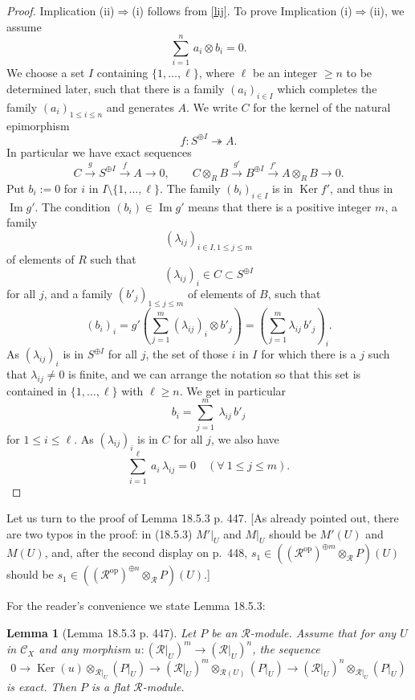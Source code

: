 \documentclass[12pt]{article}%
\newtheorem{lem}[thm]{Lemma}
\theoremstyle{remark}
\theoremstyle{definition}
\newcommand{\cc}{\mathcal}
\newcommand{\C}{\mathcal C}
\newcommand{\epi}{\twoheadrightarrow}
\newcommand{\then}{\Rightarrow}
\newcommand{\xr}{\xrightarrow}
\DeclareMathOperator{\Ima}{Im}
\DeclareMathOperator{\Ker}{Ker}
\DeclareMathOperator{\op}{op}
\begin{document}
\begin{proof} 
Implication (ii)$\then$(i) follows from \eqref{lij}. To prove Implication (i)$\then$(ii), we assume 
$$
\sum_{i=1}^n\,a_i\otimes b_i=0.
$$ 
We choose a set $I$ containing $\{1,\dots,\ell\}$, where $\ell$ be an integer $\ge n$ to be determined later, such that there is a family $(a_i)_{i\in I}$ which completes the family $(a_i)_{1\le i\le n}$ and generates $A$. We write $C$ for the kernel of the natural epimorphism 
$$
f:S^{\oplus I}\epi A.
$$ 
In particular we have exact sequences 
$$
C\xr gS^{\oplus I}\xr fA\to0,\qquad C\otimes_RB\xr{g'}B^{\oplus I}\xr{f'}A\otimes_RB\to0.
$$ 
Put $b_i:=0$ for $i$ in $I\setminus\{1,\dots,\ell\}$. The family $(b_i)_{i\in I}$ is in $\Ker f'$, and thus in $\Ima g'$. The condition $(b_i)\in\Ima g'$ means that there is a positive integer $m$, a family 
$$
(\lambda_{ij})_{i\in I,1\le j\le m}
$$ 
of elements of $R$ such that 
$$
(\lambda_{ij})_i\in C\subset S^{\oplus I}
$$ 
for all $j$, and a family $(b'_j)_{1\le j\le m}$ of elements of $B$, such that 
$$
(b_i)_i=g'
\left(\sum_{j=1}^m(\lambda_{ij})_i\otimes b'_j\right)=
\left(\sum_{j=1}^m\lambda_{ij}\,b'_j\right)_i.
$$ 
As $(\lambda_{ij})_i$ is in $S^{\oplus I}$ for all $j$, the set of those $i$ in $I$ for which there is a $j$ such that $\lambda_{ij}\neq0$ is finite, and we can arrange the notation so that this set is contained in $\{1,\dots,\ell\}$ with $\ell\ge n$. We get in particular  
$$
b_i=\sum_{j=1}^m\ \lambda_{ij}\,b'_j
$$ 
for $1\le i\le\ell$. As $(\lambda_{ij})_i$ is in $C$ for all $j$, we also have 
$$
\sum_{i=1}^\ell\ a_i\,\lambda_{ij}=0\quad(\forall\ 1\le j\le m).
$$
\end{proof}

Let us turn to the proof of Lemma 18.5.3 p. 447. [As already pointed out, there are two typos in the proof: in (18.5.3) $M'|_U$ and $M|_U$ should be $M'(U)$ and $M(U)$, and, after the second display on p.~448, $s_1\in((\cc R^{\op})^{\oplus m}\otimes_{\cc R}P)(U)$ should be $s_1\in((\cc R^{\op})^{\oplus n}\otimes_{\cc R}P)(U)$.]

For the reader's convenience we state Lemma 18.5.3: 

\begin{lem}[Lemma 18.5.3 p. 447]\label{l1853}
Let $P$ be an $\cc R$-module. Assume that for any $U$ in $\C_X$ and any morphism $u:(\cc R|_U)^m\to(\cc R|_U)^n$, the sequence 
$$
0\to\Ker(u)\otimes_{\cc R|_U}(P|_U)\to(\cc R|_U)^m\otimes_{\cc R(U)}(P|_U)\to(\cc R|_U)^n\otimes_{\cc R|_U}(P|_U)
$$ 
is exact. Then $P$ is a flat $\cc R$-module.
\end{lem}
\end{document}
